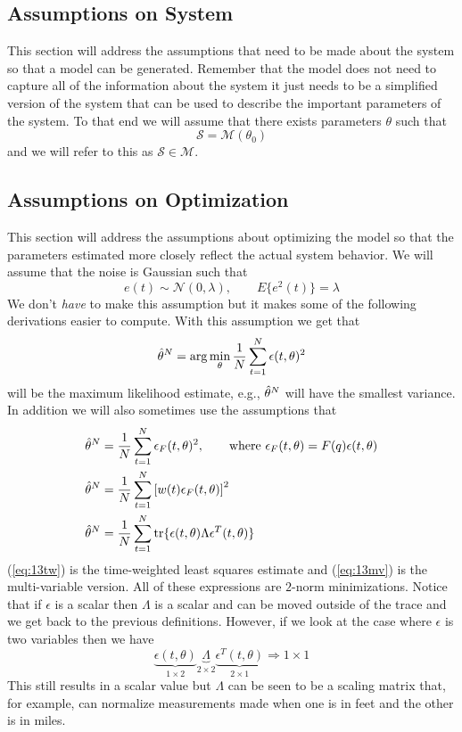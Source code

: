 \subsection{Assumptions on System}
This section will address the assumptions that need to be made about the system so that a model can be generated. Remember that the model does not need to capture all of the information about the system it just needs to be a simplified version of the system that can be used to describe the important parameters of the system. To that end we will assume that there exists parameters $\theta$ such that
$$\mathcal{S}=\mathcal{M}(\theta_0)$$
and we will refer to this as $\mathcal{S}\in\mathcal{M}$.

\subsection{Assumptions on Optimization}
This section will address the assumptions about optimizing the model so that the parameters estimated more closely reflect the actual system behavior. We will assume that the noise is Gaussian such that
$$e(t)\sim\mathcal{N}(0,\lambda), \qquad E\{e^2(t)\}=\lambda$$
We don't \textit{have} to make this assumption but it makes some of the following derivations easier to compute. With this assumption we get that
$$\hat{\theta}^N = \arg\min_\theta \frac{1}{N}\sum_{t=1}^N \epsilon(t,\theta)^2$$
will be the maximum likelihood estimate, e.g., $\hat{\theta}^N$ will have the smallest variance. In addition we will also sometimes use the assumptions that
\begin{align}
\label{eq:13filter}
\hat{\theta}^N &= \frac{1}{N}\sum_{t=1}^N\epsilon_F(t,\theta)^2, \qquad \text{where } \epsilon_F(t,\theta)=F(q)\epsilon(t,\theta) \\
\label{eq:13tw}
\hat{\theta}^N &= \frac{1}{N}\sum_{t=1}^N\left[w(t)\epsilon_F(t,\theta)\right]^2 \\
\label{eq:13mv}
\hat{\theta}^N &= \frac{1}{N}\sum_{t=1}^N\text{tr}\{\epsilon(t,\theta)\Lambda\epsilon^T(t,\theta)\}
\end{align}
(\ref{eq:13tw}) is the time-weighted least squares estimate and (\ref{eq:13mv}) is the multi-variable version. All of these expressions are $2$-norm minimizations. Notice that if $\epsilon$ is a scalar then $\Lambda$ is a scalar and can be moved outside of the trace and we get back to the previous definitions. However, if we look at the case where $\epsilon$ is two variables then we have
$$\underbrace{\epsilon(t,\theta)}_{1\times2}\underbrace{\Lambda}_{2\times2}\underbrace{\epsilon^T(t,\theta)}_{2\times1}\Rightarrow1\times1$$
This still results in a scalar value but $\Lambda$ can be seen to be a scaling matrix that, for example, can normalize measurements made when one is in feet and the other is in miles.

